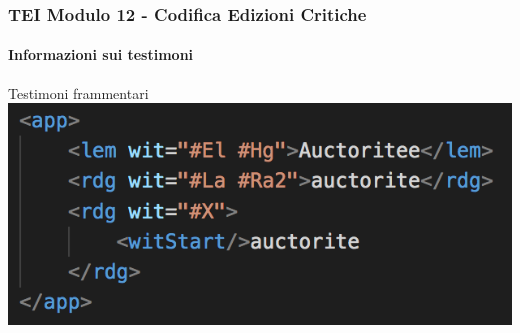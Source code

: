 \begin{frame}
    \frametitle{TEI Modulo 12 - Codifica Edizioni Critiche}
    \framesubtitle{Informazioni sui testimoni}
    \addtocounter{nframe}{1}
    







    \begin{block}{Testimoni frammentari}
        \includegraphics[width=.95\textwidth]{imgs/rdg-witStart.png}
     \end{block}


\end{frame}


